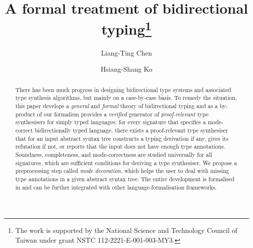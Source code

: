 \documentclass[orivec,envcountsame,envcountsect,oribibl]{llncs}
\author{Liang-Ting Chen
\orcidID{0000-0002-3250-1331}
\and 
Hsiang-Shang Ko
\orcidID{0000-0002-2439-1048}}
\institute{Institute of Information Science, Academia Sinica, Taiwan}
\title{A formal treatment of bidirectional typing\thanks{The work is supported by the National Science and Technology Council of Taiwan under grant NSTC 112-2221-E-001-003-MY3.}}
\numberwithin{table}{section}
\begin{document}
\maketitle

\begin{abstract}
There has been much progress in designing bidirectional type systems and associated type synthesis algorithms, but mainly on a case-by-case basis.
To remedy the situation, this paper develops a \emph{general} and \emph{formal} theory of bidirectional typing and as a by-product of our formalism provides a \emph{verified} generator of \emph{proof-relevant} type synthesisers for simply typed languages: for every signature that specifies a mode-correct bidirectionally typed language, there exists a proof-relevant type synthesiser that for an input abstract syntax tree constructs a typing derivation if any, gives its refutation if not, or reports that the input does not have enough type annotations.
Soundness, completeness, and mode-correctness are studied universally for all signatures, which are sufficient conditions for deriving a type synthesiser.
We propose a preprocessing step called \emph{mode decoration}, which helps the user to deal with missing type annotations in a given abstract syntax tree.
The entire development is formalised in \Agda and can be further integrated with other language-formalisation frameworks.
\end{abstract}













\appendix



\end{document}
